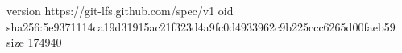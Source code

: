 version https://git-lfs.github.com/spec/v1
oid sha256:5e9371114ca19d31915ac21f323d4a9fc0d4933962c9b225ccc6265d00faeb59
size 174940
